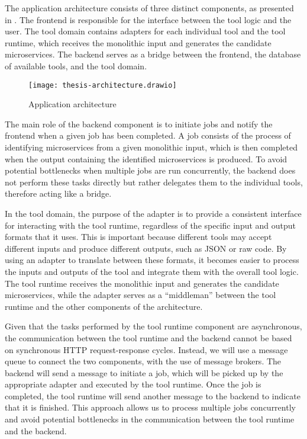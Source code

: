 The application architecture consists of three distinct components, as
presented in . The frontend is responsible for the
interface between the tool logic and the user. The tool domain contains
adapters for each individual tool and the tool runtime, which receives the
monolithic input and generates the candidate microservices. The backend serves
as a bridge between the frontend, the database of available tools, and the tool
domain.

\begin{figure*}[!htb]
  \caption{Application architecture}
  \label{fig:tool-architecture}
  \centering
  \texttt{[image: thesis-architecture.drawio]}
\end{figure*}

The main role of the backend component is to initiate jobs and notify the
frontend when a given job has been completed. A job consists of the process of
identifying microservices from a given monolithic input, which is then
completed when the output containing the identified microservices is produced.
To avoid potential bottlenecks when multiple jobs are run concurrently, the
backend does not perform these tasks directly but rather delegates them to the
individual tools, therefore acting like a bridge.

In the tool domain, the purpose of the adapter is to provide a consistent
interface for interacting with the tool runtime, regardless of the specific
input and output formats that it uses. This is important because different
tools may accept different inputs and produce different outputs, such as JSON
or raw code. By using an adapter to translate between these formats, it becomes
easier to process the inputs and outputs of the tool and integrate them with
the overall tool logic. The tool runtime receives the monolithic input and
generates the candidate microservices, while the adapter serves as a
``middleman'' between the tool runtime and the other components of the
architecture.

Given that the tasks performed by the tool runtime component are asynchronous,
the communication between the tool runtime and the backend cannot be based on
synchronous HTTP request-response cycles. Instead, we will use a message queue
to connect the two components, with the use of message brokers. The backend
will send a message to initiate a job, which will be picked up by the
appropriate adapter and executed by the tool runtime. Once the job is
completed, the tool runtime will send another message to the backend to
indicate that it is finished. This approach allows us to process multiple jobs
concurrently and avoid potential bottlenecks in the communication between the
tool runtime and the backend.
